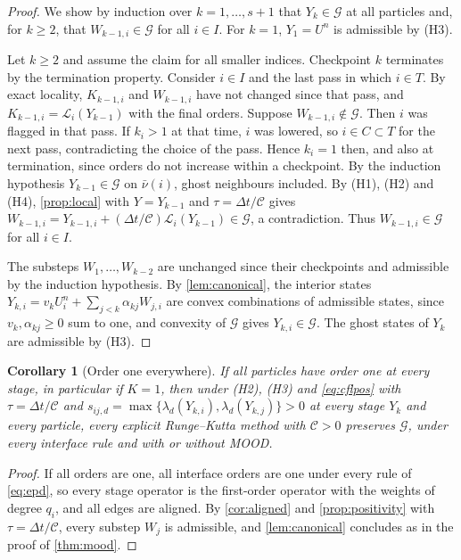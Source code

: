 \documentclass[11pt,a4paper]{article}
\theoremstyle{plain}
\newtheorem{corollary}[theorem]{Corollary}
\theoremstyle{definition}
\theoremstyle{remark}
\numberwithin{equation}{section}
\newcommand{\cnb}{\bar\nu}
\newcommand{\Ad}{\mathcal{G}}
\newcommand{\Lop}{\mathcal{L}}
\newcommand{\Csp}{\mathcal{C}}
\begin{document}
\begin{proof}
We show by induction over $k=1,\dots,s+1$ that $Y_k\in\Ad$ at all particles and, for $k\ge2$, that $W_{k-1,i}\in\Ad$ for all $i\in I$. For $k=1$, $Y_1=U^n$ is admissible by (H3).

Let $k\ge2$ and assume the claim for all smaller indices. Checkpoint $k$ terminates by the termination property. Consider $i\in I$ and the last pass in which $i\in T$. By exact locality, $K_{k-1,i}$ and $W_{k-1,i}$ have not changed since that pass, and $K_{k-1,i}=\Lop_i(Y_{k-1})$ with the final orders. Suppose $W_{k-1,i}\notin\Ad$. Then $i$ was flagged in that pass. If $k_i>1$ at that time, $i$ was lowered, so $i\in C\subset T$ for the next pass, contradicting the choice of the pass. Hence $k_i=1$ then, and also at termination, since orders do not increase within a checkpoint. By the induction hypothesis $Y_{k-1}\in\Ad$ on $\cnb(i)$, ghost neighbours included. By (H1), (H2) and (H4), \cref{prop:local} with $Y=Y_{k-1}$ and $\tau=\Delta t/\Csp$ gives $W_{k-1,i}=Y_{k-1,i}+(\Delta t/\Csp)\Lop_i(Y_{k-1})\in\Ad$, a contradiction. Thus $W_{k-1,i}\in\Ad$ for all $i\in I$.

The substeps $W_1,\dots,W_{k-2}$ are unchanged since their checkpoints and admissible by the induction hypothesis. By \cref{lem:canonical}, the interior states $Y_{k,i}=v_kU^n_i+\sum_{j<k}\alpha_{kj}W_{j,i}$ are convex combinations of admissible states, since $v_k,\alpha_{kj}\ge0$ sum to one, and convexity of $\Ad$ gives $Y_{k,i}\in\Ad$. The ghost states of $Y_k$ are admissible by (H3).
\end{proof}

\begin{corollary}[Order one everywhere]\label{cor:ssp}
If all particles have order one at every stage, in particular if $K=1$, then under (H2), (H3) and \eqref{eq:cflpos} with $\tau=\Delta t/\Csp$ and $s_{ij,d}=\max\{\lambda_d(Y_{k,i}),\lambda_d(Y_{k,j})\}>0$ at every stage $Y_k$ and every particle, every explicit Runge--Kutta method with $\Csp>0$ preserves $\Ad$, under every interface rule and with or without MOOD.
\end{corollary}

\begin{proof}
If all orders are one, all interface orders are one under every rule of \eqref{eq:epd}, so every stage operator is the first-order operator with the weights of degree $q_i$, and all edges are aligned. By \cref{cor:aligned} and \cref{prop:positivity} with $\tau=\Delta t/\Csp$, every substep $W_j$ is admissible, and \cref{lem:canonical} concludes as in the proof of \cref{thm:mood}.
\end{proof}
\end{document}
